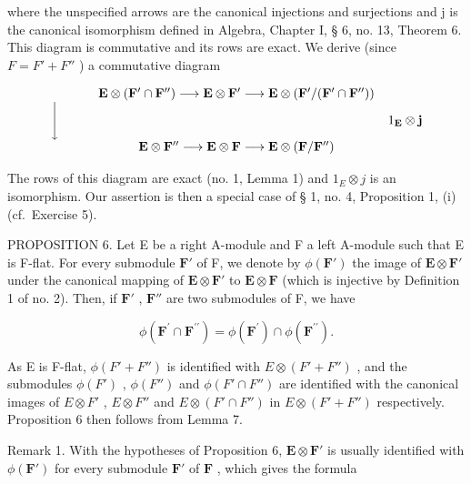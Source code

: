 where the unspecified arrows are the canonical injections and surjections and j is the canonical isomorphism defined in Algebra, Chapter I, § 6, no. 13, Theorem 6. This diagram is commutative and its rows are exact. We derive (since \(F = F' + F''\) ) a commutative diagram

\[
\begin{array}{c} \mathbf {E} \otimes (\mathbf {F} ^ {\prime} \cap \mathbf {F} ^ {\prime \prime}) \longrightarrow \mathbf {E} \otimes \mathbf {F} ^ {\prime} \longrightarrow \mathbf {E} \otimes (\mathbf {F} ^ {\prime} / (\mathbf {F} ^ {\prime} \cap \mathbf {F} ^ {\prime \prime})) \\ \Biggl \downarrow \qquad \qquad \qquad \qquad \qquad \qquad \qquad \qquad \qquad \qquad \qquad \qquad \qquad 1 _ {\mathbf {E}} \otimes \mathbf {j} \\ \mathbf {E} \otimes \mathbf {F} ^ {\prime \prime} \longrightarrow \mathbf {E} \otimes \mathbf {F} \longrightarrow \mathbf {E} \otimes (\mathbf {F} / \mathbf {F} ^ {\prime \prime}) \end{array}
\]

The rows of this diagram are exact (no. 1, Lemma 1) and \(1_{E} \otimes j\) is an isomorphism. Our assertion is then a special case of § 1, no. 4, Proposition 1, (i) (cf.~Exercise 5).

PROPOSITION 6. Let E be a right A-module and F a left A-module such that E is F-flat. For every submodule \(\mathbf{F}'\) of F, we denote by \(\phi(\mathbf{F}')\) the image of \(\mathbf{E} \otimes \mathbf{F}'\) under the canonical mapping of \(\mathbf{E} \otimes \mathbf{F}'\) to \(\mathbf{E} \otimes \mathbf{F}\) (which is injective by Definition 1 of no. 2). Then, if \(\mathbf{F}'\) , \(\mathbf{F}''\) are two submodules of F, we have

\[
\phi (\mathbf {F} ^ {\prime} \cap \mathbf {F} ^ {\prime \prime}) = \phi (\mathbf {F} ^ {\prime}) \cap \phi (\mathbf {F} ^ {\prime \prime}).
\]

As E is F-flat, \(\phi(F' + F'')\) is identified with \(E \otimes (F' + F'')\) , and the submodules \(\phi(F')\) , \(\phi(F'')\) and \(\phi(F' \cap F'')\) are identified with the canonical images of \(E \otimes F'\) , \(E \otimes F''\) and \(E \otimes (F' \cap F'')\) in \(E \otimes (F' + F'')\) respectively. Proposition 6 then follows from Lemma 7.

Remark 1. With the hypotheses of Proposition 6, \(\mathbf{E} \otimes \mathbf{F}'\) is usually identified with \(\phi(\mathbf{F}')\) for every submodule \(\mathbf{F}'\) of \(\mathbf{F}\) , which gives the formula

